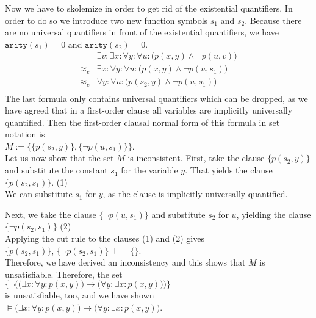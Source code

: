 Now we have to skolemize in order to get rid of the existential quantifiers.
In order to do so we introduce two new function symbols  $s_1$ and $s_2$. 
Because there are no universal quantifiers in front of the existential quantifiers, 
we have  $\mathtt{arity}(s_1) = 0$ and $\mathtt{arity}(s_2) = 0$.
$$
\begin{array}{ll}
           & \exists v\colon  \exists x\colon \forall y\colon \forall u\colon \Big( p(x,y) \wedge \neg p(u,v) \Big)\\
 \approx_e & \exists x\colon \forall y\colon \forall u\colon \Big( p(x,y) \wedge \neg p(u,s_1) \Big)\\
 \approx_e & \forall y\colon \forall u\colon \Big( p(s_2,y) \wedge \neg p(u,s_1) \Big)\\
\end{array}
$$
The last formula only contains universal quantifiers which can be dropped, as we have
agreed that in a first-order clause all variables are implicitly universally quantified.
Then the first-order clausal normal form of this formula in set notation is
\\[0.2cm]
\hspace*{1.3cm}
$M := \Big\{ \big\{ p(s_2,y) \big\}, \big\{\neg p(u,s_1)\big\}\Big\}$. 
\\[0.2cm]
Let us now show that the set  $M$ is inconsistent.  First, take the clause
 $\big\{ p(s_2,y) \big\}$ and substitute the constant  $s_1$ for the variable $y$.  That
 yields the clause \\[0.2cm]
\hspace*{1.3cm}  $\big\{ p(s_2,s_1) \big\}$. \hspace*{\fill}(1)
\\[0.2cm]
We can substitute $s_1$ for  $y$, as the clause is implicitly universally quantified.

Next, we take the clause $\big\{\neg p(u,s_1)\big\}$ and substitute
 $s_2$ for $u$, yielding the clause \\[0.2cm]
\hspace*{1.3cm} $\big\{\neg p(s_2,s_1)\big\}$ \hspace*{\fill} (2) 
\\[0.2cm]
Applying the cut rule to the clauses  (1) and (2) gives \\[0.2cm]
\hspace*{1.3cm} 
$\big\{ p(s_2,s_1) \big\}$, \quad$\big\{\neg p(s_2,s_1)\big\}$ \quad $\vdash \quad \{\}$.
\\[0.2cm]
Therefore, we have derived an inconsistency and this shows that $M$ is unsatisfiable.
Therefore, the set \\[0.2cm]
\hspace*{1.3cm} 
$\Big\{ \neg \Big(\big(\exists x\colon \forall y\colon  p(x,y)\big) \rightarrow  \big(\forall y\colon \exists x\colon p(x,y)\big)\Big)\Big\}$
\\[0.2cm]
is unsatisfiable, too, and we have shown  \\[0.2cm]
\hspace*{1.3cm} 
$\models \big(\exists x\colon \forall y\colon  p(x,y)\big) \rightarrow  \big(\forall y\colon \exists x\colon p(x,y)\big)$.
\pagebreak

